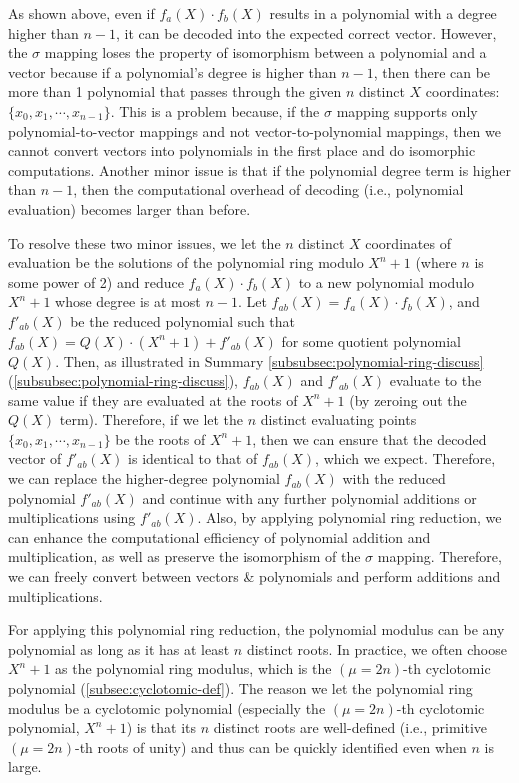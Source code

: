 As shown above, even if $f_a(X) \cdot f_b(X)$ results in a polynomial with a degree higher than $n-1$, it can be decoded into the expected correct vector. However, the $\sigma$ mapping loses the property of isomorphism between a polynomial and a vector because if a polynomial's degree is higher than $n-1$, then there can be more than 1 polynomial that passes through the given $n$ distinct $X$ coordinates: $\{x_0, x_1, \cdots, x_{n-1}\}$. This is a problem because, if the $\sigma$ mapping supports only polynomial-to-vector mappings and not vector-to-polynomial mappings, then we cannot convert vectors into polynomials in the first place and do isomorphic computations. Another minor issue is that if the polynomial degree term is higher than $n-1$, then the computational overhead of decoding (i.e., polynomial evaluation) becomes larger than before. 

To resolve these two minor issues, we let the $n$ distinct $X$ coordinates of evaluation be the solutions of the polynomial ring modulo $X^n + 1$ (where $n$ is some power of 2) and reduce $f_a(X) \cdot f_b(X)$ to a new polynomial modulo $X^n + 1$ whose degree is at most $n - 1$. Let $f_{ab}(X) = f_a(X) \cdot f_b(X)$, and $f'_{ab}(X)$ be the reduced polynomial such that $f_{ab}(X) = Q(X)\cdot (X^n + 1) + f'_{ab}(X)$ for some quotient polynomial $Q(X)$. Then, as illustrated in Summary \ref*{subsubsec:polynomial-ring-discuss} (\autoref{subsubsec:polynomial-ring-discuss}), $f_{ab}(X)$ and $f'_{ab}(X)$ evaluate to the same value if they are evaluated at the roots of $X^n + 1$ (by zeroing out the $Q(X)$ term). Therefore, if we let the $n$ distinct evaluating points $\{x_0, x_1, \cdots, x_{n-1}\}$ be the roots of $X^n + 1$, then we can ensure that the decoded vector of $f'_{ab}(X)$ is identical to that of $f_{ab}(X)$, which we expect. Therefore, we can replace the higher-degree polynomial $f_{ab}(X)$ with the reduced polynomial $f'_{ab}(X)$ and continue with any further polynomial additions or multiplications using $f'_{ab}(X)$. Also, by applying polynomial ring reduction, we can enhance the computational efficiency of polynomial addition and multiplication, as well as preserve the isomorphism of the $\sigma$ mapping. Therefore, we can freely convert between vectors \& polynomials and perform additions and multiplications. 

For applying this polynomial ring reduction, the polynomial modulus can be any polynomial as long as it has at least $n$ distinct roots. In practice, we often choose $X^n + 1$ as the polynomial ring modulus, which is the $(\mu=2n)$-th cyclotomic polynomial (\autoref{subsec:cyclotomic-def}). The reason we let the polynomial ring modulus be a cyclotomic polynomial (especially the $(\mu=2n)$-th cyclotomic polynomial, $X^n + 1$) is that its $n$ distinct roots are well-defined (i.e., primitive $(\mu=2n)$-th roots of unity) and thus can be quickly identified even when $n$ is large.

